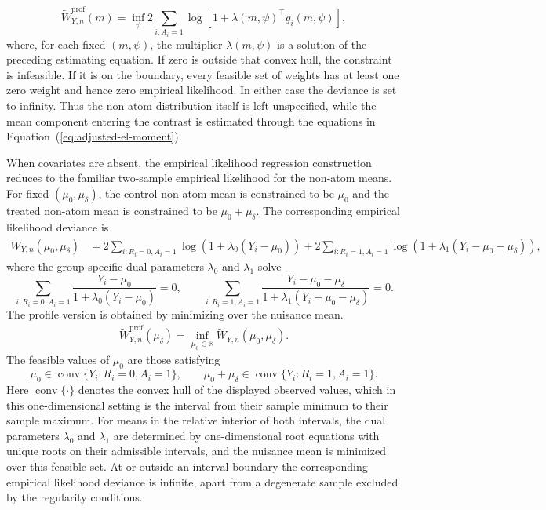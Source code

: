 \documentclass[11pt]{article}
\begin{document}
\begin{equation*}
  \widetilde{W}_{Y,n}^{\mathrm{prof}}(m)
  =
  \inf_{\psi}
  2\sum_{i:A_i=1}
  \log\left[
    1+\lambda(m,\psi)^\top g_i(m,\psi)
  \right],
\end{equation*}
where, for each fixed $(m,\psi)$, the multiplier
$\lambda(m,\psi)$ is a solution of the preceding estimating equation.
If zero is outside that convex hull, the constraint is infeasible. If it is on the boundary, every feasible set of weights has at least one zero weight and hence zero empirical likelihood. In either case the deviance is set to infinity. Thus the non-atom distribution itself is left unspecified, while the mean component entering the contrast is estimated through the equations in Equation~(\ref{eq:adjusted-el-moment}).

When covariates are absent, the empirical likelihood regression construction reduces to the familiar two-sample empirical likelihood for the non-atom means. For fixed $(\mu_0,\mu_\delta)$, the control non-atom mean is constrained to be $\mu_0$ and the treated non-atom mean is constrained to be $\mu_0+\mu_\delta$. The corresponding empirical likelihood deviance is
\begin{align*}
  \widetilde{W}_{Y,n}(\mu_0,\mu_\delta)
  &=2\sum_{i:R_i=0,A_i=1}
    \log(1+\lambda_0(Y_i-\mu_0))
  +2\sum_{i:R_i=1,A_i=1}
    \log(1+\lambda_1(Y_i-\mu_0-\mu_\delta)),
\end{align*}
where the group-specific dual parameters $\lambda_0$ and $\lambda_1$ solve
\begin{equation*}
  \sum_{i:R_i=0,A_i=1}
  \frac{Y_i-\mu_0}{1+\lambda_0(Y_i-\mu_0)}=0,
  \qquad
  \sum_{i:R_i=1,A_i=1}
  \frac{Y_i-\mu_0-\mu_\delta}
       {1+\lambda_1(Y_i-\mu_0-\mu_\delta)}=0.
\end{equation*}
The profile version is obtained by minimizing over the nuisance mean.
\begin{align*}
  \widetilde{W}_{Y,n}^{\mathrm{prof}}(\mu_\delta) = \inf_{\mu_0 \in \mathbb{R}} \widetilde{W}_{Y,n}(\mu_0,\mu_\delta).
\end{align*}
The feasible values of $\mu_0$ are those satisfying
\[
  \mu_0\in \operatorname{conv}\{Y_i:R_i=0,A_i=1\},
  \qquad
  \mu_0+\mu_\delta\in \operatorname{conv}\{Y_i:R_i=1,A_i=1\}.
\]
Here $\operatorname{conv}\{\cdot\}$ denotes the convex hull of the displayed observed values, which in this one-dimensional setting is the interval from their sample minimum to their sample maximum.
For means in the relative interior of both intervals, the dual parameters $\lambda_0$ and $\lambda_1$ are determined by one-dimensional root equations with unique roots on their admissible intervals, and the nuisance mean is minimized over this feasible set. At or outside an interval boundary the corresponding empirical likelihood deviance is infinite, apart from a degenerate sample excluded by the regularity conditions.
\end{document}
